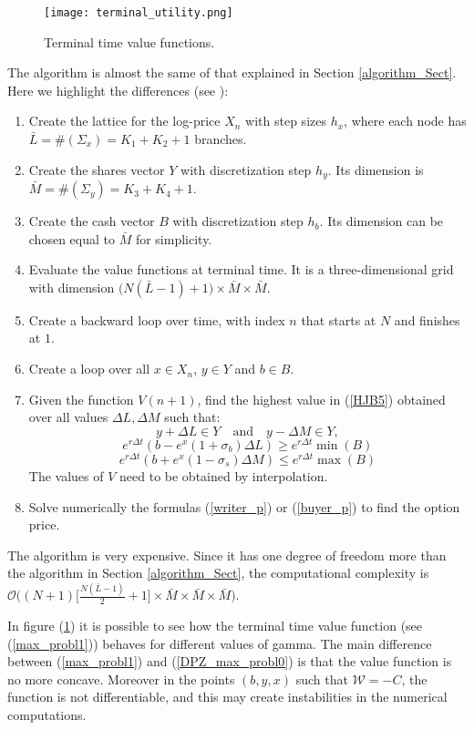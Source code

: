 \begin{figure}[t!]
   \centering
   \texttt{[image: terminal\_utility.png]}
   \caption{Terminal time value functions.}
   \label{Fig21} 
\end{figure}
The algorithm is almost the same of that explained in Section \ref{algorithm_Sect}. Here we highlight the differences (see \cite{Pal15}):
\begin{enumerate}
 \item Create the lattice for the log-price $X_n$ with step sizes $h_x$, where each node has $\bar L = \#(\Sigma_x) = K_1 + K_2 +1$ branches.
 \item Create the shares vector $Y$ with discretization step $h_y$. Its dimension is $\bar M = \#(\Sigma_y) = K_3+K_4+1$.
 \item Create the cash vector $B$ with discretization step $h_b$. Its dimension can be chosen equal to $\bar M$ for simplicity.
 \item Evaluate the value functions at terminal time. It is a three-dimensional grid with dimension $\bigl( N(\bar L-1)+1 \bigl) \times \bar M \times \bar M$.
 \item Create a backward loop over time, with index $n$ that starts at $N$ and finishes at $1$.
 \item Create a loop over all $x \in X_n$, $y \in Y$ and $b \in B$.
 \item Given the function $V(n+1)$, find the highest value in (\ref{HJB5}) obtained over all values $\Delta L, \Delta M$ such that:
 $$y + \Delta L \in Y \quad \mbox{and} \quad y - \Delta M \in Y, $$ 
 $$ e^{r\Delta t} (b - e^{x}(1+\sigma_b)\Delta L) \geq e^{r\Delta t} \min(B)$$ 
 $$ e^{r\Delta t} (b + e^{x}(1-\sigma_s)\Delta M) \leq e^{r\Delta t} \max(B) $$
 The values of $V$ need to be obtained by interpolation.
 \item Solve numerically the formulas (\ref{writer_p}) or (\ref{buyer_p}) to find the option price.      
\end{enumerate}
The algorithm is very expensive. Since it has one degree of freedom more than the algorithm in Section \ref{algorithm_Sect}, the computational complexity is 
$\mathcal{O}\biggl( (N+1)\bigl[\frac{N(\bar L-1)}{2}+1 \bigr] \times \bar M \times \bar M \times \bar M \biggr)$.

In figure (\ref{Fig21}) it is possible to see how the terminal time value function (see (\ref{max_probl1})) behaves for different values of gamma.
The main difference between (\ref{max_probl1}) and (\ref{DPZ_max_probl0}) is that the value function is no more concave. 
Moreover in the points $(b,y,x)$ such that $\mathcal{W} = -C$, the function is not differentiable, and this may create instabilities in the numerical computations.

